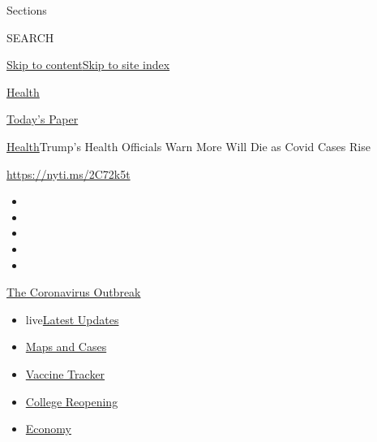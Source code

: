 Sections

SEARCH

\protect\hyperlink{site-content}{Skip to
content}\protect\hyperlink{site-index}{Skip to site index}

\href{https://www.nytimes.com/section/health}{Health}

\href{https://myaccount.nytimes.com/auth/login?response_type=cookie\&client_id=vi}{}

\href{https://www.nytimes.com/section/todayspaper}{Today's Paper}

\href{/section/health}{Health}\textbar{}Trump's Health Officials Warn
More Will Die as Covid Cases Rise

\url{https://nyti.ms/2C72k5t}

\begin{itemize}
\item
\item
\item
\item
\item
\end{itemize}

\href{https://www.nytimes.com/news-event/coronavirus?action=click\&pgtype=Article\&state=default\&region=TOP_BANNER\&context=storylines_menu}{The
Coronavirus Outbreak}

\begin{itemize}
\tightlist
\item
  live\href{https://www.nytimes.com/2020/08/04/world/coronavirus-covid-19.html?action=click\&pgtype=Article\&state=default\&region=TOP_BANNER\&context=storylines_menu}{Latest
  Updates}
\item
  \href{https://www.nytimes.com/interactive/2020/us/coronavirus-us-cases.html?action=click\&pgtype=Article\&state=default\&region=TOP_BANNER\&context=storylines_menu}{Maps
  and Cases}
\item
  \href{https://www.nytimes.com/interactive/2020/science/coronavirus-vaccine-tracker.html?action=click\&pgtype=Article\&state=default\&region=TOP_BANNER\&context=storylines_menu}{Vaccine
  Tracker}
\item
  \href{https://www.nytimes.com/2020/08/02/us/covid-college-reopening.html?action=click\&pgtype=Article\&state=default\&region=TOP_BANNER\&context=storylines_menu}{College
  Reopening}
\item
  \href{https://www.nytimes.com/live/2020/08/03/business/stock-market-today-coronavirus?action=click\&pgtype=Article\&state=default\&region=TOP_BANNER\&context=storylines_menu}{Economy}
\end{itemize}

